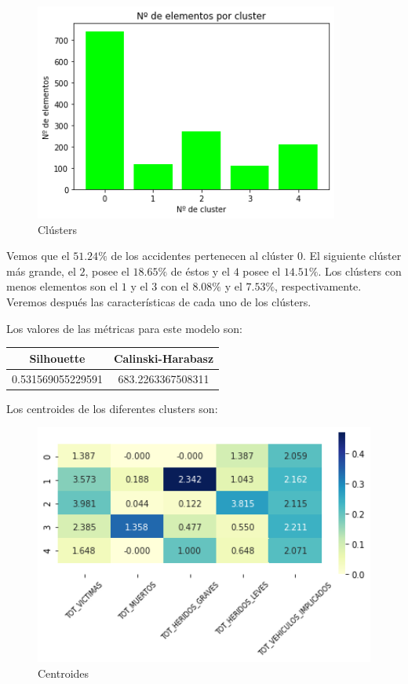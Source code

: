 \documentclass[a4]{article}
\begin{document}
\begin{figure}[H]
  \centering
  \caption{Clústers}
  \includegraphics[width=100mm]{imagenes/c1_kmeans_clusters}
\end{figure}

Vemos que el $51.24\%$ de los accidentes pertenecen al clúster $0$. El siguiente clúster más grande, el $2$, posee el $18.65\%$ de éstos y el $4$ posee el $14.51\%$. Los clústers con menos elementos son el $1$ y el $3$ con el $8.08\%$ y el $7.53\%$, respectivamente. Veremos después las características de cada uno de los clústers.

Los valores de las métricas para este modelo son:

\begin{center}
\begin{tabular}{|c|c|}
\hline
\multicolumn{1}{|c|}{\textbf{Silhouette}} & \textbf{Calinski-Harabasz}\\ \hline
 0.531569055229591   & 683.2263367508311  \\ \hline
\end{tabular}
\end{center}

Los centroides de los diferentes clusters son:

\begin{figure}[H]
  \centering
  \caption{Centroides}
  \includegraphics[width=120mm]{imagenes/c1_kmeans_centroides}
\end{figure}
\end{document}
